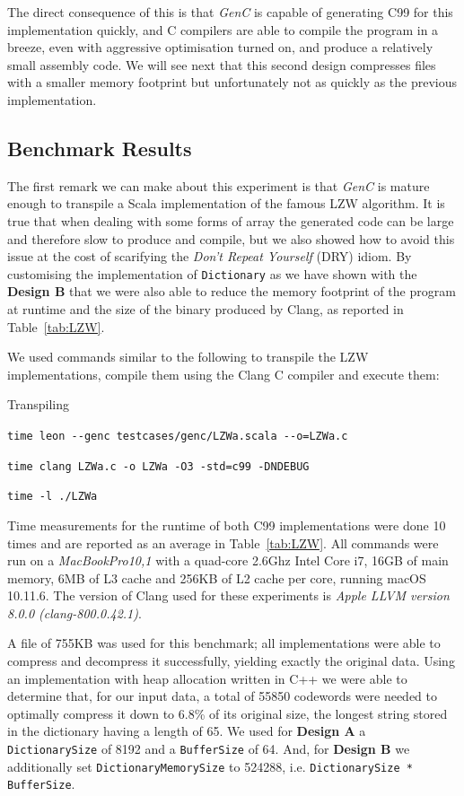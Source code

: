 \documentclass[a4paper,twoside]{article}
\newcommand{\Inline}[1]{\lstinline[basicstyle=\ttfamily]|#1|}
\newcommand{\InlineS}[1]{\lstinline[language=Leon]|#1|}
\newcommand{\GenC}{\emph{GenC}\xspace}
\newcommand{\RefTable}[1]{Table~\ref{#1}}
\begin{document}
The direct consequence of this is that \GenC is capable of generating C99 for
this implementation quickly, and C compilers are able to compile the program in
a breeze, even with aggressive optimisation turned on, and produce a relatively
small assembly code. We will see next that this second design compresses files
with a smaller memory footprint but unfortunately not as quickly as the previous
implementation.

\subsection{Benchmark Results}

The first remark we can make about this experiment is that \GenC is mature
enough to transpile a Scala implementation of the famous LZW algorithm. It is
true that when dealing with some forms of array the generated code can be large
and therefore slow to produce and compile, but we also showed how to avoid this
issue at the cost of scarifying the \emph{Don't Repeat Yourself} (DRY) idiom. By
customising the implementation of \InlineS{Dictionary} as we have shown with the
\textbf{Design B} that we were also able to reduce the memory footprint of the
program at runtime and the size of the binary produced by Clang, as reported in
\RefTable{tab:LZW}.

\pagebreak[4]
We used commands similar to the following to transpile the LZW implementations,
compile them using the Clang C compiler and execute them:

\begin{labeling}{Transpiling}

\item[Transpiling] \Inline{time leon --genc testcases/genc/LZWa.scala --o=LZWa.c}
\item[Compiling] \Inline{time clang LZWa.c -o LZWa -O3 -std=c99 -DNDEBUG}
\item[Running] \Inline{time -l ./LZWa}

\end{labeling}

Time measurements for the runtime of both C99 implementations were done 10 times
and are reported as an average in \RefTable{tab:LZW}. All commands were run on a
\emph{MacBookPro10,1} with a quad-core 2.6Ghz Intel Core i7, 16GB of main
memory, 6MB of L3 cache and 256KB of L2 cache per core, running macOS 10.11.6.
The version of Clang used for these experiments is \emph{Apple LLVM version
8.0.0 (clang-800.0.42.1)}.

A file of 755KB was used for this benchmark; all implementations were able to
compress and decompress it successfully, yielding exactly the original data.
Using an implementation with heap allocation written in C++ we were able to
determine that, for our input data, a total of 55850 codewords were needed to
optimally compress it down to 6.8\% of its original size, the longest string
stored in the dictionary having a length of 65. We used for \textbf{Design A} a
\InlineS{DictionarySize} of 8192 and a \InlineS{BufferSize} of 64. And, for
\textbf{Design B} we additionally set \InlineS{DictionaryMemorySize} to 524288,
i.e. \InlineS{DictionarySize * BufferSize}.
\end{document}
